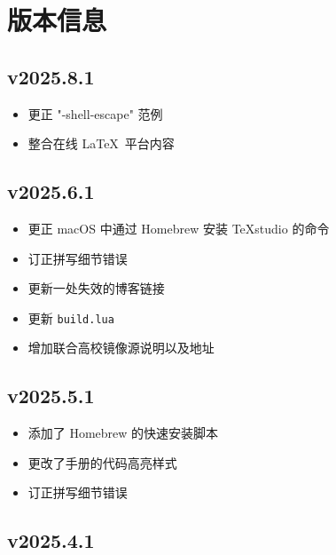 
\twocolumn

\chapter{版本信息}

\section*{v2025.8.1}

\begin{itemize}
  \item 更正 "-shell-escape" 范例
  \item 整合在线 \LaTeX\ 平台内容
\end{itemize}

\section*{v2025.6.1}

\begin{itemize}
  \item 更正 macOS 中通过 Homebrew 安装 \TeX studio 的命令
  \item 订正拼写细节错误
  \item 更新一处失效的博客链接
  \item 更新 \texttt{build.lua}
  \item 增加联合高校镜像源说明以及地址
\end{itemize}

\section*{v2025.5.1}

\begin{itemize}
  \item 添加了 Homebrew 的快速安装脚本
  \item 更改了手册的代码高亮样式
  \item 订正拼写细节错误
\end{itemize}

\section*{v2025.4.1}

